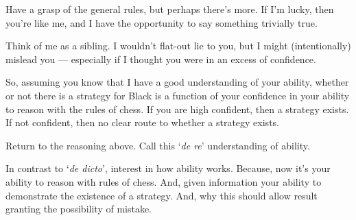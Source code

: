 \begin{note}

  Have a grasp of the general rules, but perhaps there's more.
  If I'm lucky, then you're like me, and I have the opportunity to say something trivially true.

  Think of me as a sibling.
  I wouldn't flat-out lie to you, but I might (intentionally) mislead you --- especially if I thought you were in an excess of confidence.

  So, assuming you know that I have a good understanding of your ability, whether or not there is a strategy for Black is a function of your confidence in your ability to reason with the rules of chess.
  If you are high confident, then a strategy exists.
  If not confident, then no clear route to whether a strategy exists.

  Return to the reasoning above.
  Call this `\emph{de re}' understanding of ability.

  In contrast to `\emph{de dicto}', interest in how ability works.
  Because, now it's your ability to reason with rules of chess.
  And, given information your ability to demonstrate the existence of a strategy.
  And, why this should allow result granting the possibility of mistake.
\end{note}

